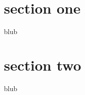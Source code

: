 \documentclass{beamer}
\begin{document}
\section{section one} 
\begin{frame}
blub
\end{frame} 

\section{section two} 
\begin{frame}
blub
\end{frame}
\end{document}
